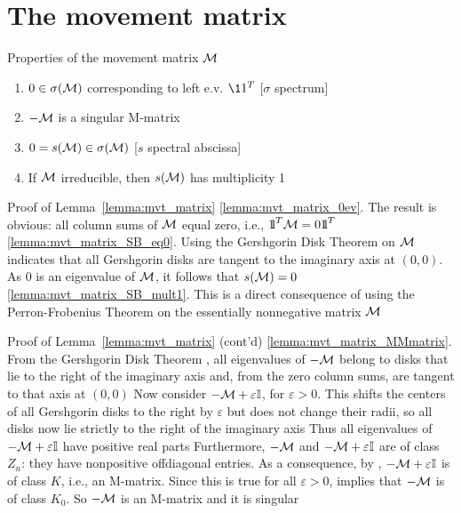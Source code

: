 \documentclass[aspectratio=169]{beamer}
\begin{document}
\section{The movement matrix}
\begin{frame}{Properties of the movement matrix $\mathcal{M}$}
	\begin{lemma}\label{lemma:mvt_matrix}
		\begin{enumerate}
			\item $0\in\sigma(\mathcal{M})$ corresponding to left e.v. $\11^T$ \hfill[$\sigma$ spectrum] \label{lemma:mvt_matrix_0ev}
			\item $-\mathcal{M}$ is a singular M-matrix \label{lemma:mvt_matrix_MMmatrix}
			\item $0=s(\mathcal{M})\in\sigma(\mathcal{M})$ \hfill[$s$ spectral abscissa] \label{lemma:mvt_matrix_SB_eq0}
			\item If $\mathcal{M}$ irreducible, then $s(\mathcal{M})$ has multiplicity 1 \label{lemma:mvt_matrix_SB_mult1}
		\end{enumerate}
	\end{lemma}
\end{frame}



\begin{frame}{Proof of Lemma~\ref{lemma:mvt_matrix}}
\ref{lemma:mvt_matrix_0ev}. The result is obvious: all column sums of $\mathcal{M}$ equal zero, i.e., $\nbOne^T\M=0\nbOne^T$
\vfill
\noindent\ref{lemma:mvt_matrix_SB_eq0}. Using the Gershgorin Disk Theorem \cite{Varga2010} on $\mathcal{M}$ indicates that all Gershgorin disks are tangent to the imaginary axis at $(0,0)$. As 0 is an eigenvalue of $\mathcal{M}$, it follows that $s(\mathcal{M})=0$
\vfill
\noindent\ref{lemma:mvt_matrix_SB_mult1}. This is a direct consequence of using the Perron-Frobenius Theorem on the essentially nonnegative matrix $\mathcal{M}$
\end{frame}

\begin{frame}{Proof of Lemma~\ref{lemma:mvt_matrix} (cont'd)}
	\noindent\ref{lemma:mvt_matrix_MMmatrix}. 
	From the Gershgorin Disk Theorem \cite{Varga2010}, all eigenvalues of $-\mathcal{M}$ belong to disks that lie to the right of the imaginary axis and, from the zero column sums, are tangent to that axis at $(0,0)$
	\vfill
	Now consider $-\mathcal{M}+\varepsilon\mathbb{I}$, for $\varepsilon>0$. 
	This shifts the centers of all Gershgorin disks to the right by $\varepsilon$ \cite[Problem 1.2.P8]{HornJohnson2013} but does not change their radii, so all disks now lie strictly to the right of the imaginary axis 
	\vfill
	Thus all eigenvalues of $-\mathcal{M}+\varepsilon\mathbb{I}$ have positive real parts
	\vfill
	Furthermore, $-\mathcal{M}$ and $-\mathcal{M}+\varepsilon\mathbb{I}$ are of class $Z_n$: they have nonpositive offdiagonal entries. 
	As a consequence, by \cite[Theorem 5.1.1(18)]{Fiedler2008}, $-\mathcal{M}+\varepsilon\mathbb{I}$ is of class $K$, i.e., an M-matrix.
	Since this is true for all $\varepsilon>0$, \cite[Theorem 5.2.1(1)]{Fiedler2008} implies that $-\mathcal{M}$ is of class $K_0$. 
	So $-\mathcal{M}$ is an M-matrix and it is singular
\end{frame}
\end{document}
